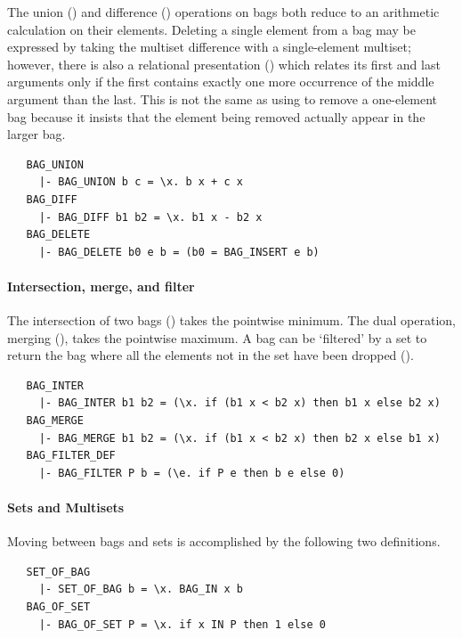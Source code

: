 {The union () and difference ()
operations on bags both reduce to an arithmetic calculation on their
elements. Deleting a single element from a bag may be expressed by
taking the multiset difference with a single-element multiset;
however, there is also a relational presentation
() which relates its first and last arguments only
if the first contains exactly one more occurrence of the middle
argument than the last.  This is not the same as using
 to remove a one-element bag because it insists that
the element being removed actually appear in the larger bag.
%
\begin{hol}
\begin{verbatim}
   BAG_UNION
     |- BAG_UNION b c = \x. b x + c x
   BAG_DIFF
     |- BAG_DIFF b1 b2 = \x. b1 x - b2 x
   BAG_DELETE
     |- BAG_DELETE b0 e b = (b0 = BAG_INSERT e b)
\end{verbatim}
\end{hol}

\paragraph {Intersection, merge, and filter}

The intersection of two bags () takes the pointwise
minimum. The dual operation, merging (), takes the
pointwise maximum. A bag can be `filtered' by a set to return the bag
where all the elements not in the set have been dropped
().
%
\begin{hol}
\begin{verbatim}
   BAG_INTER
     |- BAG_INTER b1 b2 = (\x. if (b1 x < b2 x) then b1 x else b2 x)
   BAG_MERGE
     |- BAG_MERGE b1 b2 = (\x. if (b1 x < b2 x) then b2 x else b1 x)
   BAG_FILTER_DEF
     |- BAG_FILTER P b = (\e. if P e then b e else 0)
\end{verbatim}
\end{hol}

\paragraph {Sets and Multisets}

Moving between bags and sets is accomplished by the following two
definitions.
%
\begin{hol}
\begin{verbatim}
   SET_OF_BAG
     |- SET_OF_BAG b = \x. BAG_IN x b
   BAG_OF_SET
     |- BAG_OF_SET P = \x. if x IN P then 1 else 0
\end{verbatim}
\end{hol}

}
